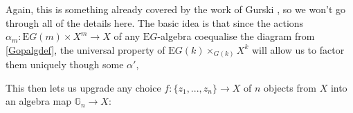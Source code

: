 Again, this is something already covered by the work of Gurski \cite{ogge}, so we won't go through all of the details here. The basic idea is that since the actions $\alpha_m : \mathrm{E}G(m) \times X^m \to X$ of any $\mathrm{E}G$-algebra coequalise the diagram from \cref{Gopalgdef}, the universal property of $\mathrm{E}G(k) \times_{G(k)} X^k$ will allow us to factor them uniquely though some $\alpha'$,
\begin{eq*}  \end{eq*}
This then lets us upgrade any choice $f : \{ z_1, ..., z_n \} \to X$ of $n$ objects from $X$ into an algebra map $\mathbb{G}_n \to X$:
\begin{eq*}  \end{eq*}

